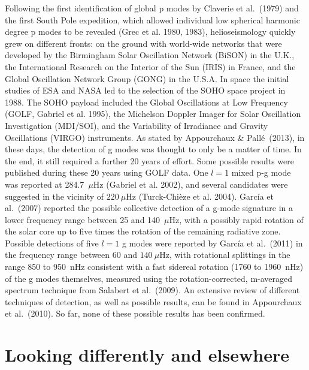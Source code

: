 \documentclass[bibyear]{aa}
\begin{document}
Following the first identification of global p modes by Claverie et al.~(1979) and the first South Pole expedition, which allowed individual low spherical harmonic degree p modes to be revealed (Grec et al. 1980, 1983), helioseismology quickly grew on different fronts: on the ground with  world-wide networks that were developed by the Birmingham Solar Oscillation Network (BiSON) in the U.K., the International Research on the Interior of the Sun (IRIS) in France, and the Global Oscillation Network Group (GONG) in the U.S.A. In space the initial studies of ESA and NASA led to the selection of the SOHO space project in 1988. The SOHO payload included the Global Oscillations at Low Frequency (GOLF, Gabriel et al. 1995), the Michelson Doppler Imager for Solar Oscillation Investigation (MDI/SOI), and the Variability of Irradiance and Gravity Oscillations (VIRGO) instruments. As stated by Appourchaux \& Pall\'e~(2013), in these days, the detection of g modes was thought to only be a matter of time. In the end, it still required a further 20 years of effort. Some possible results were published during these 20 years using GOLF data. One $l=1$ mixed p-g mode was reported at 284.7~$\mu$Hz (Gabriel et al. 2002), and several candidates were suggested in the vicinity of $220\ \mu$Hz (Turck-Chi\`eze et al. 2004). Garc\'ia et al.~(2007) reported the possible collective detection of a g-mode signature in a lower frequency range between 25 and 140~$\mu$Hz, with a possibly rapid rotation of the solar core up to five times the
rotation of the remaining radiative zone. Possible detections of five $l=1$ g modes were reported by Garc\'ia et al.~(2011) in the frequency range between 60 and $140\ \mu$Hz, with rotational splittings in the range 850 to 950~nHz consistent with a fast sidereal rotation (1760 to 1960~nHz) of the g modes themselves, measured using the rotation-corrected, m-averaged spectrum technique from Salabert et al.~(2009). An extensive review of different techniques of detection, as well as possible results, can be found in Appourchaux et al.~(2010).  So far, none of these possible results has been confirmed. 


\section{Looking differently and elsewhere}
\end{document}
